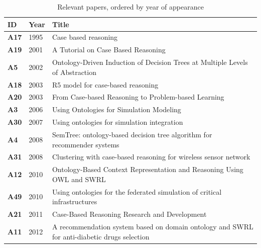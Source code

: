             
        	    {
        	    \begin{longtable}{ | m{1cm} | m{1.5cm} | m{12cm} | }
                    \caption{\label{tab:rel-papers} Relevant papers, ordered by year of appearance}\\
                    \hline
                    \textbf{ID} &\textbf{Year} &\textbf{Title} \\
                    \hline
                    \endfirsthead
                    
                    \hline
                    \textbf{A17} &1995 &Case based reasoning \\
                    \hline
                    \textbf{A19} &2001 &A Tutorial on Case Based Reasoning \\
                    \hline
                    \textbf{A5} &2002 &Ontology-Driven Induction of Decision Trees at Multiple Levels of Abstraction \\
                    \hline
                    \textbf{A18} &2003 &R5 model for case-based reasoning \\
                    \hline
                    \textbf{A20} &2003 &From Case-based Reasoning to Problem-based Learning \\
                    \hline
                    \textbf{A3} &2006 &Using Ontologies for Simulation Modeling \\
                    \hline
                    \textbf{A30} &2007 &Using ontologies for simulation integration \\
                    \hline
                    \textbf{A4} &2008 &SemTree: ontology-based decision tree algorithm for recommender systems \\
                    \hline
                    \textbf{A31} &2008 &Clustering with case-based reasoning for wireless sensor network \\
                    \hline
                    \textbf{A12} &2010 &Ontology-Based Context Representation and Reasoning Using OWL and SWRL \\
                    \hline
                    \textbf{A49} &2010 &Using ontologies for the federated simulation of critical infrastructures \\
                    \hline
                    \textbf{A21} &2011 &Case-Based Reasoning Research and Development \\
                    \hline
                    \textbf{A11} &2012 &A recommendation system based on domain ontology and SWRL for anti-diabetic drugs selection \\

\end{longtable}}
